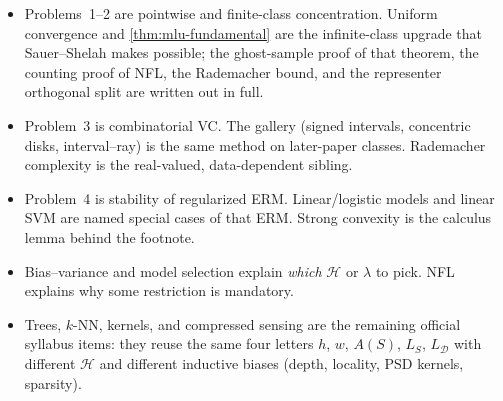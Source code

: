 \begin{summary}
\label{sum:mlu}
\begin{itemize}
    \item Problems~1--2 are pointwise and finite-class concentration. Uniform convergence and \cref{thm:mlu-fundamental} are the infinite-class upgrade that Sauer--Shelah makes possible; the ghost-sample proof of that theorem, the counting proof of NFL, the Rademacher bound, and the representer orthogonal split are written out in full.
    \item Problem~3 is combinatorial VC. The gallery (signed intervals, concentric disks, interval--ray) is the same method on later-paper classes. Rademacher complexity is the real-valued, data-dependent sibling.
    \item Problem~4 is stability of regularized ERM. Linear/logistic models and linear SVM are named special cases of that ERM. Strong convexity is the calculus lemma behind the footnote.
    \item Bias--variance and model selection explain \emph{which} $\mathcal{H}$ or $\lambda$ to pick. NFL explains why some restriction is mandatory.
    \item Trees, $k$-NN, kernels, and compressed sensing are the remaining official syllabus items: they reuse the same four letters $h$, $w$, $A(S)$, $L_S$, $L_{\mathcal{D}}$ with different $\mathcal{H}$ and different inductive biases (depth, locality, PSD kernels, sparsity).
\end{itemize}
\end{summary}
